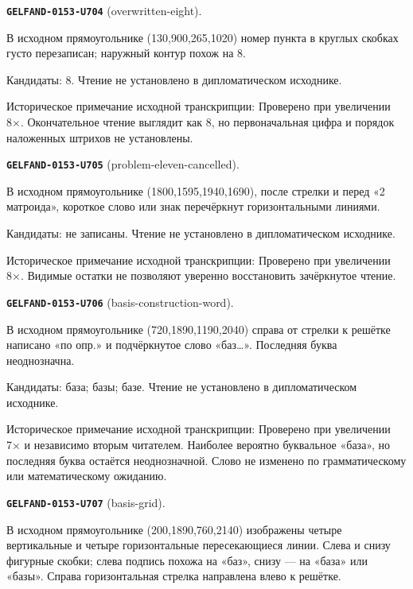 \par\noindent\leavevmode{}\label{GELFAND-0153-U704}\textbf{\texttt{GELFAND-0153-U704}} (overwritten-eight).\nopagebreak[4]\par
В исходном прямоугольнике (130,900,265,1020) номер пункта в круглых скобках густо перезаписан; наружный контур похож на 8.\par
Кандидаты: 8. Чтение не установлено в дипломатическом исходнике.\par
Историческое примечание исходной транскрипции: Проверено при увеличении 8×. Окончательное чтение выглядит как 8, но первоначальная цифра и порядок наложенных штрихов не установлены.\par\medskip
\par\noindent\leavevmode{}\label{GELFAND-0153-U705}\textbf{\texttt{GELFAND-0153-U705}} (problem-eleven-cancelled).\nopagebreak[4]\par
В исходном прямоугольнике (1800,1595,1940,1690), после стрелки и перед «2 матроида», короткое слово или знак перечёркнут горизонтальными линиями.\par
Кандидаты: не записаны. Чтение не установлено в дипломатическом исходнике.\par
Историческое примечание исходной транскрипции: Проверено при увеличении 8×. Видимые остатки не позволяют уверенно восстановить зачёркнутое чтение.\par\medskip
\par\noindent\leavevmode{}\label{GELFAND-0153-U706}\textbf{\texttt{GELFAND-0153-U706}} (basis-construction-word).\nopagebreak[4]\par
В исходном прямоугольнике (720,1890,1190,2040) справа от стрелки к решётке написано «по опр.» и подчёркнутое слово «баз…». Последняя буква неоднозначна.\par
Кандидаты: база; базы; базе. Чтение не установлено в дипломатическом исходнике.\par
Историческое примечание исходной транскрипции: Проверено при увеличении 7× и независимо вторым читателем. Наиболее вероятно буквальное «база», но последняя буква остаётся неоднозначной. Слово не изменено по грамматическому или математическому ожиданию.\par\medskip
\par\noindent\leavevmode{}\label{GELFAND-0153-U707}\textbf{\texttt{GELFAND-0153-U707}} (basis-grid).\nopagebreak[4]\par
В исходном прямоугольнике (200,1890,760,2140) изображены четыре вертикальные и четыре горизонтальные пересекающиеся линии. Слева и снизу фигурные скобки; слева подпись похожа на «баз», снизу — на «база» или «базы». Справа горизонтальная стрелка направлена влево к решётке.\par
